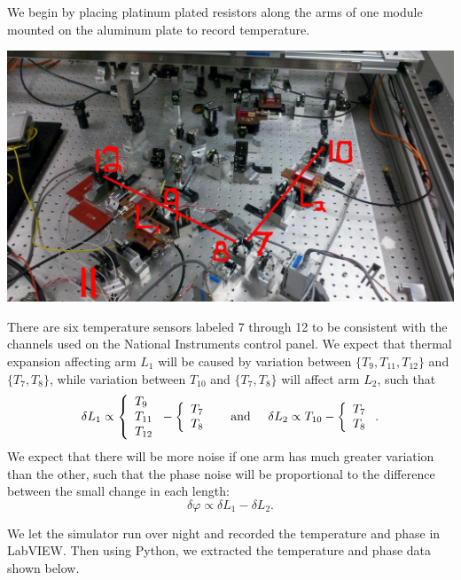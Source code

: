 \documentclass[11 pt]{article}
\begin{document}
\indent\indent We begin by placing platinum plated resistors along the arms of one module mounted on the aluminum plate to record temperature.\\\begin{center}\includegraphics[width=5.5in]{expectations.jpg}\end{center}

There are six temperature sensors labeled 7 through 12 to be consistent with the channels used on the National Instruments control panel. We expect that thermal expansion affecting arm $L_1$ will be caused by variation between $\{T_9, T_{11}, T_{12}\}$ and $\{T_7,T_8\}$, while variation between  $T_{10}$ and $\{T_7,T_8\}$ will affect arm $L_2$, such that 
$$\delta L_1 \propto \left\{\begin{array}{l} T_9 \\T_{11} \\T_{12}\end{array}\right. - \left\{\begin{array}{l} T_7 \\T_8 \end{array}\right.\hspace{.5cm}\text{and}\hspace{.5cm} \delta L_2 \propto T_{10} - \left\{\begin{array}{l} T_7 \\T_8 \end{array}\right..$$ We expect that there will be more noise if one arm has much greater variation than the other, such that the phase noise will be proportional to the difference between the small change in each length: $$\delta\varphi\propto\delta L_1-\delta L_2.$$

We let the simulator run over night and recorded the temperature and phase in LabVIEW. Then using Python, we extracted the temperature and phase data shown below.
\end{document}
